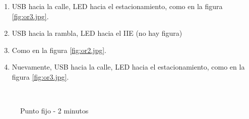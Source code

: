 \documentclass[main]{subfiles}
\begin{document}
\begin{enumerate}
\item USB hacia la calle, LED hacia el estacionamiento, como en la figura \ref{fig:or3.jpg}.
\item USB hacia la rambla, LED hacia el IIE (no hay figura)
\item Como en la figura \ref{fig:or2.jpg}.
\item Nuevamente, USB hacia la calle, LED hacia el estacionamiento, como en la figura \ref{fig:or3.jpg}.
\end{enumerate}

\begin{figure}[h!]
\caption{Punto fijo - 2 minutos}
  \hspace{-50pt}
  \\


\end{figure}
\end{document}
